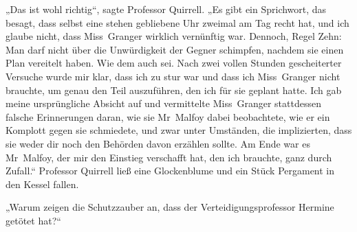 „Das ist wohl richtig“, sagte Professor Quirrell.
„Es gibt ein Sprichwort, das besagt, dass selbst eine stehen gebliebene Uhr zweimal am Tag recht hat, und ich glaube nicht, dass Miss~Granger wirklich vernünftig war. Dennoch, Regel Zehn: Man darf nicht über die Unwürdigkeit der Gegner schimpfen, nachdem sie einen Plan vereitelt haben. Wie dem auch sei. Nach zwei vollen Stunden gescheiterter Versuche wurde mir klar, dass ich zu stur war und dass ich Miss~Granger nicht brauchte, um genau den Teil auszuführen, den ich für sie geplant hatte. Ich gab meine ursprüngliche Absicht auf und vermittelte Miss~Granger stattdessen falsche Erinnerungen daran, wie sie Mr~Malfoy dabei beobachtete, wie er ein Komplott gegen sie schmiedete, und zwar unter Umständen, die implizierten, dass sie weder dir noch den Behörden davon erzählen sollte. Am Ende war es Mr~Malfoy, der mir den Einstieg verschafft hat, den ich brauchte, ganz durch Zufall.“
Professor Quirrell ließ eine Glockenblume und ein Stück Pergament in den Kessel fallen.

„Warum zeigen die Schutzzauber an, dass der Verteidigungsprofessor Hermine getötet hat?“

